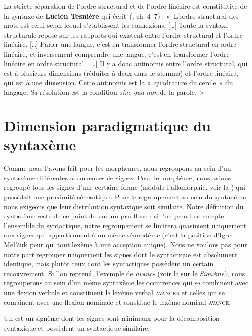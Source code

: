 {    La stricte séparation de l’ordre structural et de l’ordre linéaire est constitutive de la syntaxe de \textbf{Lucien Tesnière} qui écrit~(\citeyear{tesniere1959elements}, ch. 4--7) : «~L’ordre structural des mots est celui selon lequel s’établissent les connexions. […] Toute la syntaxe structurale repose sur les rapports qui existent entre l’ordre structural et l’ordre linéaire. […] Parler une langue, c’est en transformer l’ordre structural en ordre linéaire, et inversement comprendre une langue, c’est en transformer l’ordre linéaire en ordre structural.~[…] Il y a donc antinomie entre l’ordre structural, qui est à plusieurs dimensions (réduites à deux dans le stemma) et l’ordre linéaire, qui est à une dimension. Cette antinomie est la «~quadrature du cercle~» du langage. Sa résolution est la condition \textit{sine qua non} de la parole.~»
}
\section{Dimension paradigmatique du syntaxème}\label{sec:3.1.9}

Comme nous l’avons fait pour les morphèmes, nous regroupons au sein d’un syntaxème différentes occurrences de signes. Pour le morphème, nous avions regroupé tous les signes d’une certaine forme (modulo l’allomorphie, voir la ) qui possédait une proximité sémantique. Pour le regroupement au sein du syntaxème, nous exigeons que leur distribution syntaxique soit similaire. Notre définition du syntaxème reste de ce point de vue un peu floue : si l’on prend en compte l’ensemble du syntactique, notre regroupement se limitera quasiment uniquement aux signes qui appartiennent à un même sémantème (c’est la position d’Igor Mel’čuk pour qui tout lexème à une acception unique). Nous ne voulons pas pour notre part regrouper uniquement les signes dont le syntactique est absolument identique, mais plutôt ceux dont les syntactiques possèdent un certain recouvrement. Si l’on reprend, l’exemple de \textit{avanc-} (voir la  sur le \textit{Signème}), nous regrouperons au sein d’un même syntaxème les occurrences qui se combinent avec une flexion verbale et constituent le lexème verbal \textsc{avancer} et celles qui se combinent avec une flexion nominale et constitue le lexème nominal \textsc{avance}.

{Un  est un signème dont les signes sont minimaux pour la décomposition syntaxique et possèdent un syntactique similaire.}

